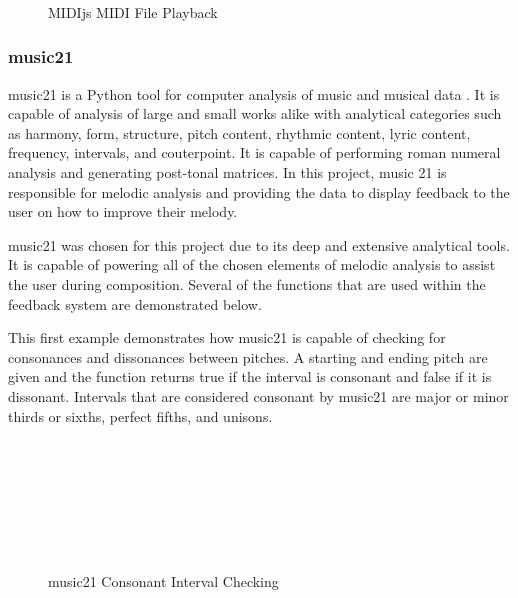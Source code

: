 \begin{figure}[!htbp]
	\caption{MIDIjs MIDI File Playback \cite{MIDIjs_ND}}
	 \\
	 \\
	 \\
\end{figure}

\subsubsection{music21}
\label{subsubsec:music21}

music21 is a Python tool for computer analysis of music and musical data \cite{Cuthbert_2020}.  It is capable of analysis of large and small works alike with analytical categories such as harmony, form, structure, pitch content, rhythmic content, lyric content, frequency, intervals, and couterpoint.  It is capable of performing roman numeral analysis and generating post-tonal matrices.  In this project, music 21 is responsible for melodic analysis and providing the data to display feedback to the user on how to improve their melody.

\vspace{\baselineskip}

music21 was chosen for this project due to its deep and extensive analytical tools.  It is capable of powering all of the chosen elements of melodic analysis to assist the user during composition.  Several of the functions that are used within the feedback system are demonstrated below.

\vspace{\baselineskip}

This first example demonstrates how music21 is capable of checking for consonances and dissonances between pitches.  A starting and ending pitch are given and the function returns true if the interval is consonant and false if it is dissonant.  Intervals that are considered consonant by music21 are major or minor thirds or sixths, perfect fifths, and unisons.

\begin{figure}[!htbp]
	\caption{music21 Consonant Interval Checking \cite{Cuthbert_2020}}
	 \\
	 \\
	 \\
	 \\
	 \\
	 \\
\end{figure}

